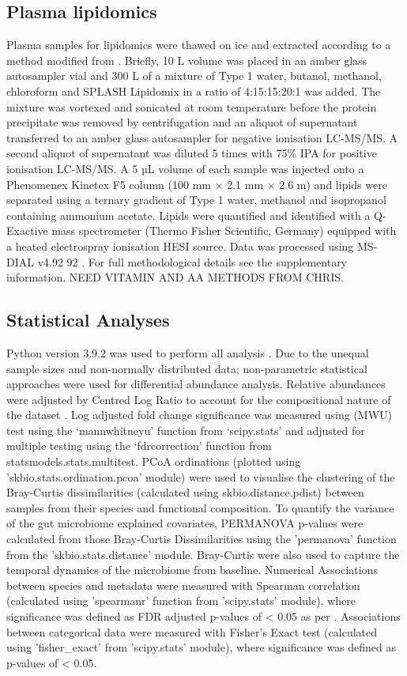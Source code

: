\documentclass{article}
\begin{document}
\subsection*{Plasma lipidomics}
Plasma samples for lipidomics were thawed on ice and extracted according to a method modified from \citet{liu2016plasma}.
Briefly, 10 \textmu{}L volume was placed in an amber glass autosampler vial and 300 \textmu{}L of a mixture of Type 1 water, butanol, methanol, chloroform and SPLASH Lipidomix in a ratio of 4:15:15:20:1 was added.
The mixture was vortexed and sonicated at room temperature before the protein precipitate was removed by centrifugation and an aliquot of supernatant transferred to an amber glass autosampler for negative ionisation LC-MS/MS.
A second aliquot of supernatant was diluted 5 times with 75\% IPA for positive ionisation LC-MS/MS.
A 5 µL volume of each sample was injected onto a Phenomenex Kinetex F5 column (100 mm × 2.1 mm × 2.6 \textmu{}m) and lipids were separated using a ternary gradient of Type 1 water, methanol and isopropanol containing ammonium acetate.
Lipids were quantified and identified with a Q-Exactive mass spectrometer (Thermo Fisher Scientific, Germany) equipped with a heated electrospray ionisation HESI source.
Data was processed using MS-DIAL v4.92 92 \cite{tsugawa2015ms}.
For full methodological details see the supplementary information.
NEED VITAMIN AND AA METHODS FROM CHRIS.

\subsection*{Statistical Analyses}
Python version 3.9.2 was used to perform all analysis \cite{van1995python}.
Due to the unequal sample sizes and non-normally distributed data; non-parametric statistical approaches were used for differential abundance analysis.
Relative abundances were adjusted by Centred Log Ratio to account for the compositional nature of the dataset \cite{gloor2016s}.
Log adjusted fold change significance was measured using (MWU) test using the ‘mannwhitneyu’ function from ‘scipy.stats’ and adjusted for multiple testing using the ‘fdrcorrection’ function from statsmodels.stats.multitest.
PCoA ordinations (plotted using 'skbio.stats.ordination.pcoa' module) were used to visualise the clustering of the Bray-Curtis dissimilarities (calculated using skbio.distance.pdist) between samples from their species and functional composition.
To quantify the variance of the gut microbiome explained covariates, PERMANOVA p-values were calculated from those Bray-Curtis Dissimilarities using the ’permanova’ function from the 'skbio.stats.distance' module.
Bray-Curtis were also used to capture the temporal dynamics of the microbiome from baseline.
Numerical Associations between species and metadata were measured with Spearman correlation (calculated using 'spearmanr' function from 'scipy.stats' module), where significance was defined as FDR adjusted p-values of \textless{} 0.05 as per \citet{2020SciPyNMeth}.
Associations between categorical data were measured with Fisher's Exact test (calculated using 'fisher\_exact' from 'scipy.stats' module), where significance was defined as p-values of \textless{} 0.05.
\end{document}

